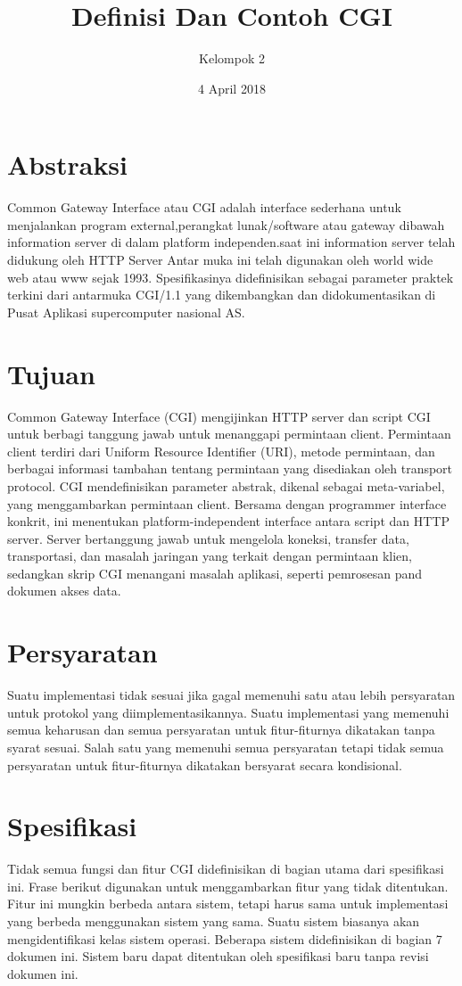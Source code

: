 \documentclass{article}
\title{Definisi Dan Contoh CGI}
\author{Kelompok 2}
\date{4 April 2018}
\begin{document}
\maketitle
\section{Abstraksi}
Common Gateway Interface atau CGI adalah interface sederhana untuk menjalankan program external,perangkat lunak/software  atau gateway dibawah information server di dalam platform independen.saat ini information server telah didukung oleh HTTP Server
Antar muka ini telah digunakan oleh world wide web  atau www sejak 1993. Spesifikasinya didefinisikan sebagai parameter praktek terkini dari antarmuka CGI/1.1 yang dikembangkan dan didokumentasikan di Pusat Aplikasi supercomputer nasional AS.
\section{Tujuan}
Common Gateway Interface (CGI) mengijinkan HTTP server dan script CGI untuk berbagi tanggung jawab untuk menanggapi permintaan client. Permintaan client terdiri dari Uniform Resource Identifier (URI),  metode permintaan, dan berbagai informasi tambahan tentang permintaan yang disediakan oleh transport protocol.
CGI mendefinisikan parameter abstrak, dikenal sebagai meta-variabel, yang menggambarkan permintaan client. Bersama  dengan programmer interface konkrit, ini menentukan platform-independent interface antara script dan HTTP server.
Server bertanggung jawab untuk mengelola koneksi, transfer data, transportasi, dan masalah jaringan yang terkait dengan permintaan klien, sedangkan skrip CGI menangani masalah aplikasi, seperti pemrosesan pand dokumen akses data.
\section{Persyaratan}
Suatu implementasi tidak sesuai jika gagal memenuhi satu atau lebih persyaratan untuk protokol yang diimplementasikannya. Suatu implementasi yang memenuhi semua keharusan dan semua persyaratan untuk fitur-fiturnya dikatakan tanpa syarat sesuai. Salah satu yang memenuhi semua persyaratan tetapi tidak semua persyaratan untuk fitur-fiturnya dikatakan bersyarat secara kondisional.
\section{Spesifikasi}
Tidak semua fungsi dan fitur CGI didefinisikan di bagian utama dari spesifikasi ini. Frase berikut digunakan untuk menggambarkan fitur yang tidak ditentukan.
Fitur ini mungkin berbeda antara sistem, tetapi harus sama untuk implementasi yang berbeda menggunakan sistem yang sama. Suatu sistem biasanya akan mengidentifikasi kelas sistem operasi. Beberapa sistem didefinisikan di bagian 7 dokumen ini. Sistem baru dapat ditentukan oleh spesifikasi baru tanpa revisi  dokumen ini.
\end{document}
